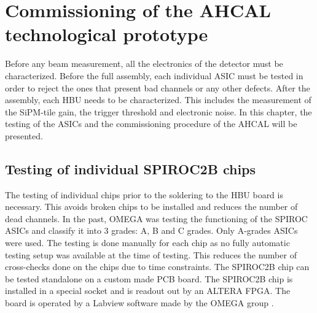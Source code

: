 \chapter{Commissioning of the AHCAL technological prototype}
\label{chap:Commissioning}

Before any beam measurement, all the electronics of the detector must be characterized. Before the full assembly, each individual ASIC must be tested in order to reject the ones that present bad channels or any other defects. After the assembly, each HBU needs to be characterized. This includes the measurement of the SiPM-tile gain, the trigger threshold and electronic noise. In this chapter, the testing of the ASICs and the commissioning procedure of the AHCAL will be presented.

\section{Testing of individual SPIROC2B chips}

The testing of individual chips prior to the soldering to the HBU board is necessary. This avoids broken chips to be installed and reduces the number of dead channels. In the past, OMEGA was testing the functioning of the SPIROC ASICs and classify it into 3 grades: A, B and C grades. Only A-grades ASICs were used. The testing is done manually for each chip as no fully automatic testing setup was available at the time of testing. This reduces the number of cross-checks done on the chips due to time constraints. The SPIROC2B chip can be tested standalone on a custom made PCB board. The SPIROC2B chip is installed in a special socket and is readout out by an ALTERA FPGA. The board is operated by a Labview software made by the OMEGA group \cite{OmegaWeb}.


